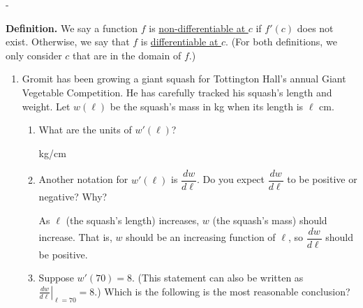 \documentclass{article}
\makeatletter
\newlength{\tipmargin}
\renewenvironment{framed}{
  \setlength{\tipmargin}{\textwidth-\linewidth}
  \advance\@totalleftmargin-\tipmargin
  \def\FrameCommand{\hspace{\tipmargin}\fbox}%
  \advance\linewidth\tipmargin
  \MakeFramed {\advance\hsize-\width \FrameRestore}%
}
{\endMakeFramed}
\makeatother
\begin{document}
\begin{framed}
  \textbf{Definition.} We say a function $f$ is
  \uline{non-differentiable at $c$} if $f'(c)$ does not exist.
  Otherwise, we say that $f$ is \uline{differentiable at $c$}. (For
  both definitions, we only consider $c$ that are in the domain of
  $f$.) 
\end{framed}

\begin{enumerate}[resume]
\item  \label{interpret-derivatives-gromit-copy}


  \label{interpret-derivatives-gromit}

  Gromit has been growing a giant squash for Tottington Hall's annual Giant Vegetable Competition. He has carefully tracked his squash's length and weight. Let $w(\ell)$ be the squash's mass in kg when its length is $\ell$ cm.
  \begin{enumerate}
  \item
    \begin{problem}[0.25in]
      What are the units of $w'(\ell)$?  
    \end{problem}

    \begin{solution}
      kg/cm
    \end{solution}

  \item
    \begin{problem}[0.35in]
      Another notation for $w'(\ell)$ is $\dfrac{dw}{d\ell}$. Do you expect $\dfrac{dw}{d\ell}$ to be positive or negative? Why?
    \end{problem}

    \begin{solution}
      As $\ell$ (the squash's length) increases, $w$ (the squash's mass) should increase. That is, $w$ should be an increasing function of $\ell$, so $\dfrac{dw}{d\ell}$ should be positive.
    \end{solution}

  \item


    Suppose $w'(70) = 8$. (This statement can also be written as $\displaystyle \left. \frac{dw}{d\ell} \right|_{\ell=70} = 8$.) Which is the following is the most reasonable conclusion?


\end{enumerate}
\end{enumerate}
\end{document}
